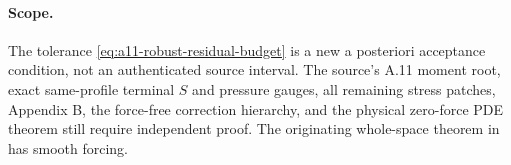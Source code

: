 \paragraph{Scope.}
The tolerance \eqref{eq:a11-robust-residual-budget} is a new
a posteriori acceptance condition, not an authenticated source
interval. The source's A.11 moment root, exact same-profile terminal
$S$ and pressure gauges, all remaining stress patches, Appendix B,
the force-free correction hierarchy, and the physical zero-force
PDE theorem still require independent proof. The originating
whole-space theorem in \cite{openai2026} has smooth forcing.
